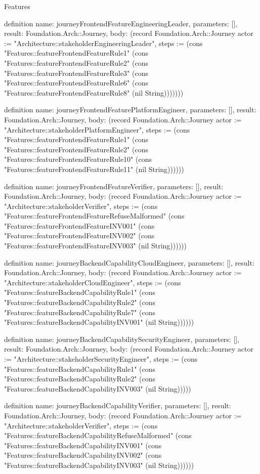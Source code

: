 \begin{lexlean}{Features}
\begin{semanticmodule}
definition{
  name: journeyFrontendFeatureEngineeringLeader,
  parameters: [],
  result: Foundation.Arch::Journey,
  body: (record Foundation.Arch::Journey {actor := "Architecture::stakeholderEngineeringLeader", steps := (cons "Features::featureFrontendFeatureRule1" (cons "Features::featureFrontendFeatureRule2" (cons "Features::featureFrontendFeatureRule3" (cons "Features::featureFrontendFeatureRule6" (cons "Features::featureFrontendFeatureRule8" (nil String))))))})
}

definition{
  name: journeyFrontendFeaturePlatformEngineer,
  parameters: [],
  result: Foundation.Arch::Journey,
  body: (record Foundation.Arch::Journey {actor := "Architecture::stakeholderPlatformEngineer", steps := (cons "Features::featureFrontendFeatureRule1" (cons "Features::featureFrontendFeatureRule2" (cons "Features::featureFrontendFeatureRule10" (cons "Features::featureFrontendFeatureRule11" (nil String)))))})
}

definition{
  name: journeyFrontendFeatureVerifier,
  parameters: [],
  result: Foundation.Arch::Journey,
  body: (record Foundation.Arch::Journey {actor := "Architecture::stakeholderVerifier", steps := (cons "Features::featureFrontendFeatureRefuseMalformed" (cons "Features::featureFrontendFeatureINV001" (cons "Features::featureFrontendFeatureINV002" (cons "Features::featureFrontendFeatureINV003" (nil String)))))})
}

definition{
  name: journeyBackendCapabilityCloudEngineer,
  parameters: [],
  result: Foundation.Arch::Journey,
  body: (record Foundation.Arch::Journey {actor := "Architecture::stakeholderCloudEngineer", steps := (cons "Features::featureBackendCapabilityRule1" (cons "Features::featureBackendCapabilityRule2" (cons "Features::featureBackendCapabilityRule7" (cons "Features::featureBackendCapabilityINV001" (nil String)))))})
}

definition{
  name: journeyBackendCapabilitySecurityEngineer,
  parameters: [],
  result: Foundation.Arch::Journey,
  body: (record Foundation.Arch::Journey {actor := "Architecture::stakeholderSecurityEngineer", steps := (cons "Features::featureBackendCapabilityRule1" (cons "Features::featureBackendCapabilityRule2" (cons "Features::featureBackendCapabilityINV003" (nil String))))})
}

definition{
  name: journeyBackendCapabilityVerifier,
  parameters: [],
  result: Foundation.Arch::Journey,
  body: (record Foundation.Arch::Journey {actor := "Architecture::stakeholderVerifier", steps := (cons "Features::featureBackendCapabilityRefuseMalformed" (cons "Features::featureBackendCapabilityINV001" (cons "Features::featureBackendCapabilityINV002" (cons "Features::featureBackendCapabilityINV003" (nil String)))))})
}
\end{semanticmodule}
\end{lexlean}

